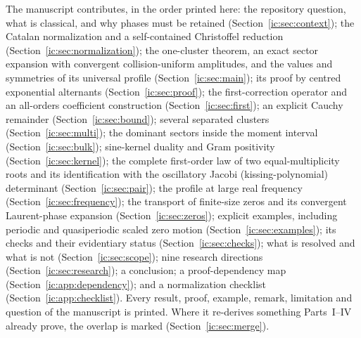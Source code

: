 \documentclass[11pt,a4paper]{article}
\numberwithin{equation}{section}
\theoremstyle{definition}
\theoremstyle{remark}
\begin{document}
The manuscript contributes, in the order printed here: the repository
question, what is classical, and why phases must be retained
(Section~\ref{ic:sec:context}); the Catalan normalization and a
self-contained Christoffel reduction (Section~\ref{ic:sec:normalization});
the one-cluster theorem, an exact sector expansion with convergent
collision-uniform amplitudes, and the values and symmetries of its universal
profile (Section~\ref{ic:sec:main}); its proof by centred exponential
alternants (Section~\ref{ic:sec:proof}); the first-correction operator and an
all-orders coefficient construction (Section~\ref{ic:sec:first}); an explicit
Cauchy remainder (Section~\ref{ic:sec:bound}); several separated clusters
(Section~\ref{ic:sec:multi}); the dominant sectors inside the moment interval
(Section~\ref{ic:sec:bulk}); sine-kernel duality and Gram positivity
(Section~\ref{ic:sec:kernel}); the complete first-order law of two
equal-multiplicity roots and its identification with the oscillatory Jacobi
(kissing-polynomial) determinant (Section~\ref{ic:sec:pair}); the profile at
large real frequency (Section~\ref{ic:sec:frequency}); the transport of
finite-size zeros and its convergent Laurent-phase expansion
(Section~\ref{ic:sec:zeros}); explicit examples, including periodic and
quasiperiodic scaled zero motion (Section~\ref{ic:sec:examples}); its checks
and their evidentiary status (Section~\ref{ic:sec:checks}); what is resolved
and what is not (Section~\ref{ic:sec:scope}); nine research directions
(Section~\ref{ic:sec:research}); a conclusion; a proof-dependency map
(Section~\ref{ic:app:dependency}); and a normalization checklist
(Section~\ref{ic:app:checklist}).  Every result, proof, example, remark,
limitation and question of the manuscript is printed.  Where it re-derives
something Parts~I--IV already prove, the overlap is marked
(Section~\ref{ic:sec:merge}).
\end{document}
